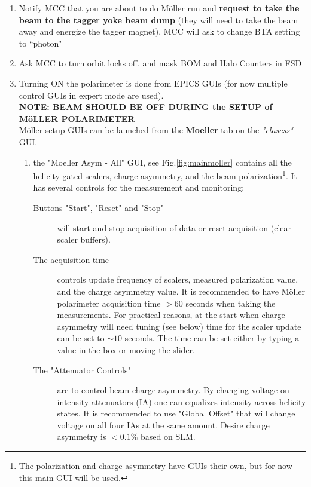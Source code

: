 \begin{enumerate}
\item Notify MCC that you are about to do M{\"o}ller run and \textbf{request
to take the beam to the tagger yoke beam dump} (they will need to take the beam
away and energize the tagger magnet), MCC will ask to change BTA setting to ``photon" 
\item Ask MCC to turn orbit locks off, and mask BOM and Halo Counters in FSD 
\item Turning ON the polarimeter is done from EPICS GUIs (for now multiple control GUIs in expert mode are used). \\
{\bf NOTE: BEAM SHOULD BE OFF DURING the SETUP of M{\"o}LLER POLARIMETER}\\
M{\"o}ller setup GUIs can be launched from the \textbf{Moeller} tab on the \emph{"clascss"} GUI. 

\begin{enumerate}
\item the "Moeller Asym - All" GUI, see Fig.\ref{fig:mainmoller} contains all the helicity gated scalers, charge asymmetry, and the beam polarization\footnote{The polarization and charge asymmetry have GUIs their own, but for now this main GUI will be used.}. It has several controls for the measurement and monitoring: 
\begin{description}
\item[Buttons "Start", "Reset" and "Stop"] will start and stop acquisition of data or reset acquisition (clear scaler buffers). 
\item[The acquisition time] controls update frequency of scalers, measured polarization value, and the charge asymmetry value. It is recommended to have M{\"o}ller polarimeter acquisition time $>60$ seconds when taking the measurements. For practical reasons, at the start when charge asymmetry will need tuning (see below) time for the scaler update can be set to $\sim 10$ seconds. The time can be set either by typing a value in the box or moving the slider. 
\item[The "Attenuator Controls"] are to control beam charge asymmetry. By changing voltage on intensity attenuators (IA) one can equalizes intensity across helicity states. It is recommended to use "Global Offset" that will change voltage on all four IAs at the same amount. Desire charge asymmetry is $<0.1\%$ based on SLM. 
\end{description}


\end{enumerate}
\end{enumerate}
